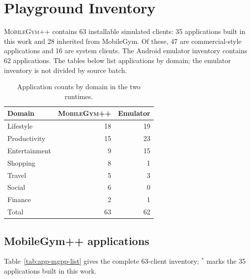 \section{Playground Inventory}
\label{app:mgpp-apps}

\textsc{MobileGym++} contains 63 installable simulated clients: 35 applications built in this work and 28 inherited from MobileGym. Of these, 47 are commercial-style applications and 16 are system clients. The Android emulator inventory contains 62 applications. The tables below list applications by domain; the emulator inventory is not divided by source batch.

\begin{table}[H]
\centering
\small
\caption{Application counts by domain in the two runtimes.}
\label{tab:app-domain-counts}
\begin{tabular}{lrr}
\toprule
Domain & \textsc{MobileGym++} & Emulator \\
\midrule
Lifestyle & 18 & 19 \\
Productivity & 15 & 23 \\
Entertainment & 9 & 15 \\
Shopping & 8 & 1 \\
Travel & 5 & 3 \\
Social & 6 & 0 \\
Finance & 2 & 1 \\
\midrule
Total & 63 & 62 \\
\bottomrule
\end{tabular}
\end{table}

\subsection{MobileGym++ applications}
\label{app:mgpp-app-table}

Table~\ref{tab:app-mgpp-list} gives the complete 63-client inventory; $^\ast$ marks the 35 applications built in this work.

